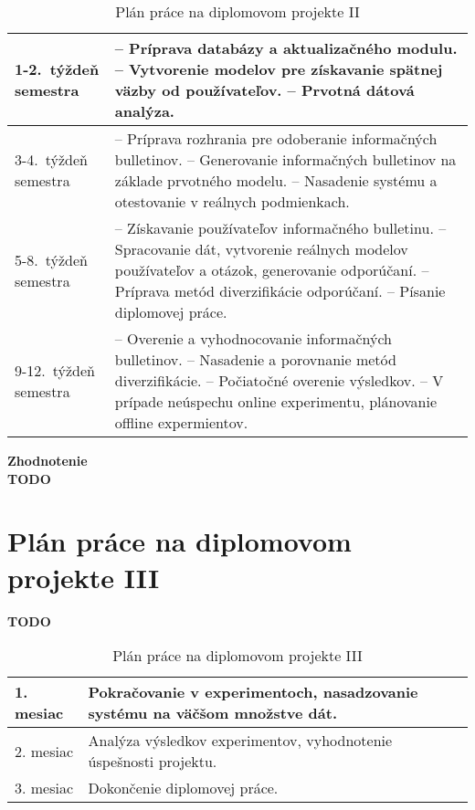 \begin{table}[h]
\centering
\caption{Plán práce na diplomovom projekte II}
\begin{tabular}{|m{2.3cm}|m{12cm}|}
\hline
1-2.~týždeň semestra   & -- Príprava databázy a aktualizačného modulu.
				\newline -- Vytvorenie modelov pre získavanie spätnej väzby od používateľov.
				\newline -- Prvotná dátová analýza.
				\\ \hline
3-4.~týždeň semestra   & -- Príprava rozhrania pre odoberanie informačných bulletinov.
				\newline -- Generovanie informačných bulletinov na základe prvotného modelu.
				\newline -- Nasadenie systému a otestovanie v reálnych podmienkach.
				\\ \hline
5-8.~týždeň semestra   & -- Získavanie používateľov informačného bulletinu.
				\newline -- Spracovanie dát, vytvorenie reálnych modelov používateľov a otázok, generovanie odporúčaní.
				\newline -- Príprava metód diverzifikácie odporúčaní.
				\newline -- Písanie diplomovej práce.
				\\ \hline
9-12.~týždeň semestra  & -- Overenie a vyhodnocovanie informačných bulletinov.
				\newline -- Nasadenie a porovnanie metód diverzifikácie.
				\newline -- Počiatočné overenie výsledkov.
				\newline -- V prípade neúspechu online experimentu, plánovanie offline expermientov.
				\\ \hline
\end{tabular}
\end{table}

\textbf{Zhodnotenie}\\
\textbf{TODO}

\section{Plán práce na diplomovom projekte III}

\textbf{TODO}

\begin{table}[h]
\centering
\caption{Plán práce na diplomovom projekte III}
\begin{tabular}{|m{2.3cm}|m{12cm}|}
\hline
1. mesiac & Pokračovanie v experimentoch, nasadzovanie systému na väčšom množstve dát. \\ \hline
2. mesiac & Analýza výsledkov experimentov, vyhodnotenie úspešnosti projektu. \\ \hline
3. mesiac & Dokončenie diplomovej práce.\\ \hline
\end{tabular}
\end{table}



